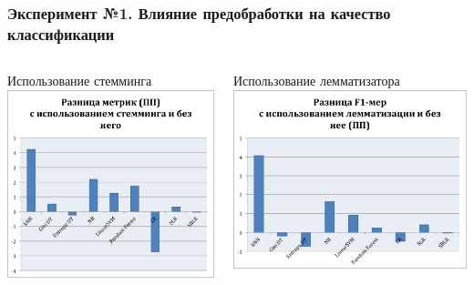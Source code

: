 \documentclass{beamer}
\begin{document}
\begin{frame}
\frametitle{Эксперимент №1. Влияние предобработки на качество классификации}
\begin{columns}[T]
    \begin{column}{.5\textwidth}
    \begin{block}{Использование стемминга}
    \includegraphics[width=\linewidth,height=\textheight,keepaspectratio]{stemming-diff.png}
    \end{block}
    \end{column}
    \begin{column}{.5\textwidth}
    \begin{block}{Использование лемматизатора}
    \includegraphics[width=\linewidth,height=\textheight,keepaspectratio]{lemmatizing-diff.png}
    \end{block}
    \end{column}
  \end{columns}
\end{frame}
\end{document}
